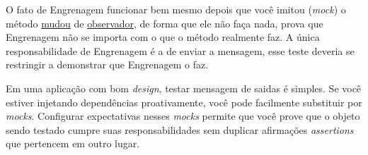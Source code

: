 O fato de Engrenagem funcionar bem mesmo depois que você imitou (\textit{mock}) o método \underline{mudou} de \underline{observador}, de forma que ele não faça nada, prova que Engrenagem não se importa com o que o método realmente faz. A única responsabilidade de Engrenagem é a de enviar a mensagem, esse teste deveria se restringir a demonstrar que Engrenagem o faz.

Em uma aplicação com bom \textit{design}, testar mensagem de saidas é simples. Se você estiver injetando dependências proativamente, você pode facilmente substituir por \textit{mocks}. Configurar expectativas nesses \textit{mocks} permite que você prove que o objeto sendo testado cumpre suas responsabilidades sem duplicar afirmações \textit{assertions} que pertencem em outro lugar.

